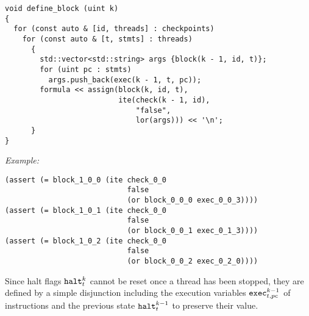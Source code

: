 \begin{lstlisting}[style=c++]
void define_block (uint k)
{
  for (const auto & [id, threads] : checkpoints)
    for (const auto & [t, stmts] : threads)
      {
        std::vector<std::string> args {block(k - 1, id, t)};
        for (uint pc : stmts)
          args.push_back(exec(k - 1, t, pc));
        formula << assign(block(k, id, t),
                          ite(check(k - 1, id),
                              "false",
                              lor(args))) << '\n';
      }
}
\end{lstlisting}

\noindent
\emph{Example:} 

\begin{lstlisting}[style=smtlib]
(assert (= block_1_0_0 (ite check_0_0
                            false
                            (or block_0_0_0 exec_0_0_3))))
(assert (= block_1_0_1 (ite check_0_0
                            false
                            (or block_0_0_1 exec_0_1_3))))
(assert (= block_1_0_2 (ite check_0_0
                            false
                            (or block_0_0_2 exec_0_2_0))))
\end{lstlisting}



\noindent
Since halt flags $\texttt{halt}^k_t$ cannot be reset once a thread has been stopped, they are defined by a simple disjunction including the execution variables $\texttt{exec}^{k - 1}_{t, pc}$ of  instructions and the previous state $\texttt{halt}^{k - 1}_t$ to preserve their value.

